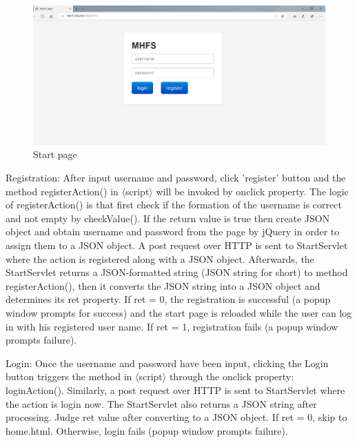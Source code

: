 \documentclass[a4paper,11pt]{article}
\begin{document}
\begin{itemize}
\begin{figure}[ht]
    \centering
    \includegraphics[scale=0.3]{1p.png}
    \caption{Start page}
    \label{fig:Start page}
\end{figure}
\par Registration: After input username and password, click 'register' button and the method registerAction() in {$\langle$}script{$\rangle$} will be invoked by onclick property. The logic of registerAction() is that first check if the formation of the username is correct and not empty by checkValue(). If the return value is true then create JSON object and obtain username and password from the page by jQuery in order to assign them to a JSON object. A post request over HTTP is sent to StartServlet where the action is registered along with a JSON object. Afterwards, the StartServlet returns a JSON-formatted string (JSON string for short) to method registerAction(), then it converts the JSON string into a JSON object and determines its ret property. If ret = 0, the registration is successful (a popup window prompts for success) and the start page is reloaded while the user can log in with his registered user name. If ret = 1, registration fails (a popup window prompts failure).
\par Login: Once the username and password have been input, clicking the Login button triggers the method in {$\langle$}script{$\rangle$} through the onclick property: loginAction(). Similarly, a post request over HTTP is sent to StartServlet where the action is login now. The StartServlet also returns a JSON string after processing. Judge ret value after converting to a JSON object. If ret = 0, skip to home.html. Otherwise, login fails (popup window prompts failure).


\end{itemize}
\end{document}
